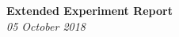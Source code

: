 \documentclass{article}
\begin{document}
\begin{titlepage}
	\begin{center}
		\Large\textbf{Extended Experiment Report}\\
		\large\textit{05 October 2018}
	\end{center}
\end{titlepage}

%
%
%
%
\end{document}
